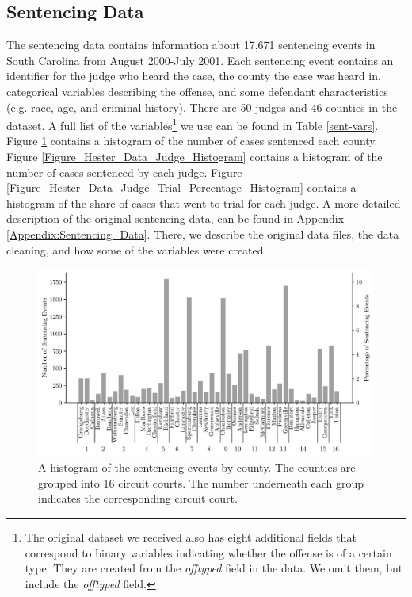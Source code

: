 \documentclass[11pt, oneside]{article}   	%
\theoremstyle{ModifiedStyle}
\begin{document}
  \subsection{Sentencing Data}
    The sentencing data contains information about 17,671 sentencing events in South Carolina from August 2000-July 2001. Each sentencing event contains an identifier for the judge who heard the case, the county the case was heard in, categorical variables describing the offense, and some defendant characteristics (e.g. race, age, and criminal history). There are 50 judges and 46 counties in the dataset. A full list of the variables\footnote{The original dataset we received also has eight additional fields that correspond to binary variables indicating whether the offense is of a certain type. They are created from the \textit{offtyped} field in the data. We omit them, but include the \textit{offtyped} field.} we use can be found in Table \ref{sent-vars}.  Figure \ref{Figure_Hester_Data_County_Histogram} contains a histogram of the number of cases sentenced each county. Figure \ref{Figure_Hester_Data_Judge_Histogram} contains a histogram of the number of cases sentenced by each judge. Figure \ref{Figure_Hester_Data_Judge_Trial_Percentage_Histogram} contains a histogram of the share of cases that went to trial for each judge. A more detailed description of the original sentencing data, can be found in Appendix \ref{Appendix:Sentencing_Data}. There, we describe the original data files, the data cleaning, and how some of the variables were created.

		\begin{figure}[H]
			\centering
			\includegraphics[scale=0.65]{Figures/County_Histogram}
			\vspace{-2mm}
			\caption{A histogram of the sentencing events by county. The counties are grouped into 16 circuit courts. The number underneath each group indicates the corresponding circuit court.}
			\label{Figure_Hester_Data_County_Histogram}
		\end{figure}
\end{document}
